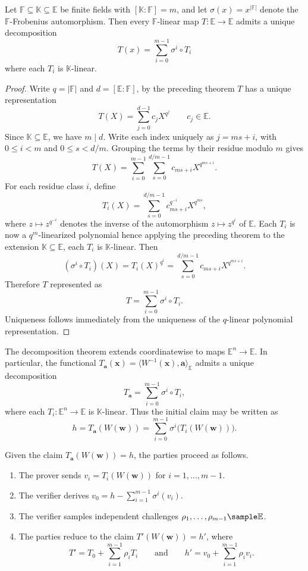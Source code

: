 \begin{theorem}
Let $\mathbb{F} \subseteq \mathbb{K} \subseteq \mathbb{E}$ be finite fields with $[\mathbb{K}:\mathbb{F}] = m$, and let $\sigma(x) = x^{|\mathbb{F}|}$ denote the $\mathbb{F}$-Frobenius automorphism. Then every $\mathbb{F}$-linear map $T: \mathbb{E} \to \mathbb{E}$ admits a unique decomposition
\[
T(x) = \sum_{i = 0}^{m - 1} \sigma^i \circ T_i
\]
where each $T_i$ is $\mathbb{K}$-linear.
\end{theorem}
\begin{proof}
Write $q=|\mathbb F|$ and $d=[\mathbb E:\mathbb F]$, by the preceding theorem $T$ has a unique representation
\[
T(X)=\sum_{j=0}^{d - 1} c_j X^{q^j} \qquad c_j\in\mathbb E \text{.}
\]
Since $\mathbb K\subseteq\mathbb E$, we have $m\mid d$. Write each
index uniquely as $j=ms+i$, with $0\leq i<m$ and $0\leq s<d/m$. Grouping the terms by their residue modulo $m$ gives
\[
T(X)
=
\sum_{i=0}^{m-1}
\sum_{s=0}^{d/m-1}
c_{ms+i}X^{q^{ms+i}}.
\]
For each residue class $i$, define
\[
T_i(X)
=
\sum_{s=0}^{d/m-1}
c_{ms+i}^{q^{-i}}X^{q^{ms}},
\]
where $z\mapsto z^{q^{-i}}$ denotes the inverse of the automorphism $z\mapsto z^{q^i}$ of $\mathbb E$. Each $T_i$ is now a $q^m$-linearized polynomial hence applying the preceding theorem to the extension $\mathbb{K} \subseteq \mathbb{E}$, each $T_i$ is $\mathbb{K}$-linear.  Then
\[
(\sigma^i\circ T_i)(X)
= T_i(X)^{q^i}
= \sum_{s=0}^{d/m-1} c_{ms+i}X^{q^{ms+i}} \text{.}
\]
Therefore $T$ represented as
\[
T=\sum_{i=0}^{m-1}\sigma^i\circ T_i \text{.}
\]
Uniqueness follows immediately from the uniqueness of the $q$-linear polynomial representation.
\end{proof}

The decomposition theorem extends coordinatewise to maps $\mathbb E^n\to\mathbb E$. In particular, the functional $T_{\mathbf a}(\mathbf{x}) = \langle W^{-1}(\mathbf{x}), \mathbf{a} \rangle_{\mathbb{E}}$ admits a unique decomposition
\begin{equation}
T_{\mathbf a}
=
\sum_{i=0}^{m-1}\sigma^i\circ T_i,
\end{equation}
where each $T_i:\mathbb E^n\to\mathbb E$ is $\mathbb K$-linear. Thus the initial claim may be written as
\[
h = T_{\mathbf a}(W(\mathbf w))
= \sum_{i=0}^{m-1} \sigma^i\bigl(T_i(W(\mathbf w))\bigr).
\]

\begin{construction}
Given the claim $T_{\mathbf a}(W(\mathbf w))=h$, the parties proceed as follows.
\begin{enumerate}
    \item The prover sends $v_i=T_i(W(\mathbf w))$  for $i=1,\ldots,m-1$.
    \item The verifier derives $v_0 = h-\sum_{i=1}^{m-1}\sigma^i(v_i)$.
    \item The verifier samples independent challenges $\rho_1,\ldots,\rho_{m-1}\sample\mathbb E$.
    \item The parties reduce to the claim $T'(W(\mathbf w))=h'$, where
    \[
    T' = T_0+\sum_{i=1}^{m-1}\rho_iT_i
    \qquad\text{and}\qquad
    h' = v_0+\sum_{i=1}^{m-1}\rho_iv_i.
    \]
\end{enumerate}
\end{construction}

